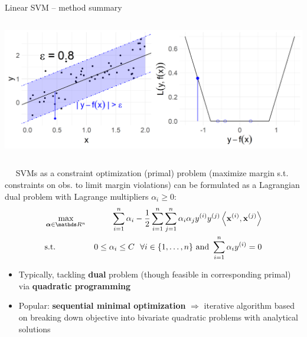 \begin{vbframe}{Linear SVM -- method summary}
\begin{columns}[T, totalwidth = \textwidth]
\begin{column}{0.4\textwidth}
  \includegraphics[height=\textwidth, keepaspectratio=true]{
  figure/loss_eps_insensitive.png}

\end{column}
\end{columns}

\medskip

 ~~ %
SVMs as a constraint optimization (primal) problem (maximize margin s.t. constraints on obs. to limit margin violations) can be formulated as a Lagrangian dual problem with Lagrange multipliers $\alpha_i \geq 0$: %
\begin{eqnarray*}
    & \max\limits_{\alphav \in \R^n} & \dualobj \\
    & \text{s.t. } & 0 \le \alpha_i \le C ~~ \forall i \in \nset \text{ and } \sum_{i=1}^n \alpha_i \yi = 0
\end{eqnarray*}

\framebreak


\begin{itemize}
  \item Typically, tackling \textbf{dual} problem (though feasible 
  in corresponding primal) via \textbf{quadratic programming}
  \item Popular: \textbf{sequential minimal optimization} $\Rightarrow$ 
  iterative algorithm based on breaking down objective into bivariate quadratic 
  problems with analytical solutions
\end{itemize}
\medskip


\end{vbframe}
